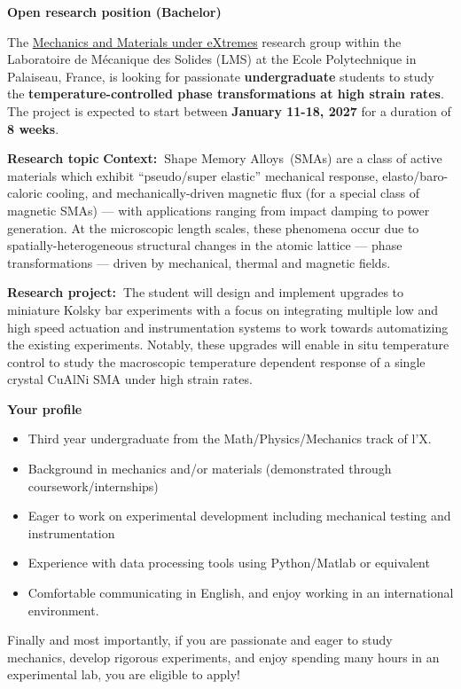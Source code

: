 \documentclass[a4paper,11pt,fleqn]{article}
\begin{document}
	\setlength{\abovedisplayskip}{2 pt}
	\setlength{\belowdisplayskip}{2 pt}
	\sffamily
	\thispagestyle{titlepage}
	\begin{center}
		\vspace*{0em}
		\Large \textbf{Open research position (Bachelor)} 
	\end{center}
	
	The \href{https://vigneshkannan-group.github.io/vk-mxm-website/}{Mechanics and Materials under eXtremes} research group within the Laboratoire de M{\'e}canique des Solides (LMS) at the Ecole Polytechnique in Palaiseau, France, is looking for passionate \textbf{undergraduate} students to study the \textbf{temperature-controlled phase transformations at high strain rates}. The project is expected to start between \textbf{January 11-18, 2027} for a duration of \textbf{8 weeks}.

	\begin{myhlbox}{\textbf{Research topic}}
		\textbf{Context:~}Shape Memory Alloys~(SMAs) are a class of active materials which exhibit ``pseudo/super elastic'' mechanical response, elasto/baro-caloric cooling, and mechanically-driven magnetic flux (for a special class of magnetic SMAs) --- with applications ranging from impact damping to power generation. At the microscopic length scales, these phenomena occur due to spatially-heterogeneous structural changes in the atomic lattice --- phase transformations --- driven by mechanical, thermal and magnetic fields. 
		
		\textbf{Research project:~}The student will design and implement upgrades to miniature Kolsky bar experiments with a focus on integrating multiple low and high speed actuation and instrumentation systems to work towards automatizing the existing experiments. Notably, these upgrades will enable in situ temperature control to study the macroscopic temperature dependent response of a single crystal CuAlNi SMA under high strain rates. 
	
	\end{myhlbox}
	
	\begin{myhlbox}{\textbf{Your profile}}
		\begin{itemize}[leftmargin=*, itemsep=-0.25em]
			\item Third year undergraduate from the Math/Physics/Mechanics track of l'X. 
			\item Background in mechanics and/or materials (demonstrated through coursework/internships)
			\item Eager to work on experimental development including mechanical testing and instrumentation
			\item Experience with data processing tools using Python/Matlab or equivalent 
			\item Comfortable communicating in English, and enjoy working in an international environment. 
		\end{itemize}
		\vspace{0em}
		Finally and most importantly, if you are passionate and eager to study mechanics, develop rigorous experiments, and enjoy spending many hours in an experimental lab, you are eligible to apply!
	\end{myhlbox}
	
\end{document}
